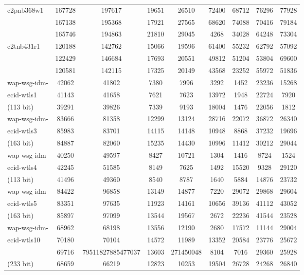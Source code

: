 \documentclass[a4paper]{article}
\begin{document}
\begin{center}
\begin{longtable}{ |l|c|c|c|c|c|c|c|c| }
c2pnb368w1 & 167728 & 197617 & 19651 & 26510 & 72400 & 68712 & 76296 & 77928 \\ 
& 167138 & 195368 & 17921 & 27565 & 68620 & 74088 & 70416 & 79184 \\ 
& 165746 & 194863 & 21810 & 29045 & 4268 & 34028 & 64248 & 73304 \\ \hline

c2tnb431r1 & 120188 & 142762 & 15066 & 19596 & 61400 & 55232 & 62792 & 57092 \\ 
& 122429 & 146684 & 17693 & 20551 & 49812 & 51204 & 53804 & 69600 \\
& 120581 & 142115 & 17325 & 20149 & 43568 & 23252 & 55972 & 51836 \\ \hline

wap-wsg-idm- & 42062 & 41802 & 7380 & 7996 & 3292 & 1452 & 23236 & 15268 \\
ecid-wtls1 & 41143 & 41658 & 7621 & 7623 & 13972 & 1948 & 22724 & 7920 \\
(113 bit) & 39291 & 39826 & 7339 & 9193 & 18004 & 1476 & 22056 & 1812 \\ \hline

wap-wsg-idm- & 83666 & 81358 & 12299 & 13124 & 28716 & 22072 & 36872 & 26340 \\
ecid-wtls3 & 85983 & 83701 & 14115 & 14148 & 10948 & 8868 & 37232 & 19696 \\
(163 bit) & 84887 & 82060 & 15235 & 14430 & 10996 & 11412 & 30212 & 29044 \\ \hline

wap-wsg-idm- & 40250 & 49597 & 8427 & 10721 & 1304 & 1416 & 8724 & 1524 \\ 
ecid-wtls4 & 42245 & 51585 & 8149 & 7625 & 1492 & 15520 & 9328 & 29120 \\ 
(113 bit) & 41496 & 49360 & 8540 & 8787 & 1640 & 5884 & 14876 & 23732 \\ \hline

wap-wsg-idm- & 84422 & 96858 & 13149 & 14877 & 7220 & 29072 & 29868 & 29604 \\
ecid-wtls5 & 83351 & 97635 & 11923 & 14161 & 10656 & 39136 & 41112 & 43052 \\
(163 bit) & 85897 & 97099 & 13544 & 19567 & 2672 & 22236 & 41544 & 23528 \\ \hline
 
wap-wsg-idm- & 68962 & 68198 & 13556 & 12190 & 2680 & 17572 & 11144 & 29004 \\ 
ecid-wtls10 & 70180 & 70104 & 14572 & 11989 & 13352 & 20584 & 23776 & 25672 \\ 
& 69716 & 79511827885477037 & 13603 & 271450048 & 8104 & 7016 & 29360 & 25928 \\
(233 bit) & 68659 & 66219 & 12823 & 10253 & 19504 & 26728 & 24268 & 26840 \\ \hline


\end{longtable}
\end{center}
\end{document}
